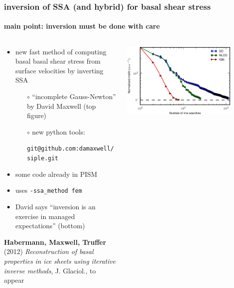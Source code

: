 \documentclass[hide notes,intlimits]{beamer}
\begin{document}
\begin{frame}
  \frametitle{inversion of SSA (and hybrid) for basal shear stress}
  \framesubtitle{main point: inversion must be done with care}

\begin{columns}
\begin{column}{0.5\textwidth}
\vspace{-10mm}
  \begin{itemize}
  \small
  \item new fast method of computing basal basal shear stress from surface velocities by inverting SSA
    \begin{itemize}
    \small
    \item[$\circ$] ``incomplete Gauss-Newton'' by David Maxwell (top figure)
    \item[$\circ$] new python tools:

    \medskip
    \tiny \texttt{git@github.com:damaxwell/siple.git}
    \end{itemize}
  \item some code already in PISM
  \item uses \texttt{-ssa\_method fem}
  \item David says ``inversion is an exercise in managed expectations'' (bottom)
  \end{itemize}

\begin{flushleft}
\scriptsize \textbf{Habermann, Maxwell, Truffer} (2012) \emph{Reconstruction of basal properties in ice sheets using iterative inverse methods}, J. Glaciol., to appear
\end{flushleft}
\end{column}

\begin{column}{0.5\textwidth}
\vspace{-5mm}
  \begin{center}
    \includegraphics[width=0.85\textwidth]{ign_vs_other}


\end{center}
\end{column}
\end{columns}
\end{frame}
\end{document}
